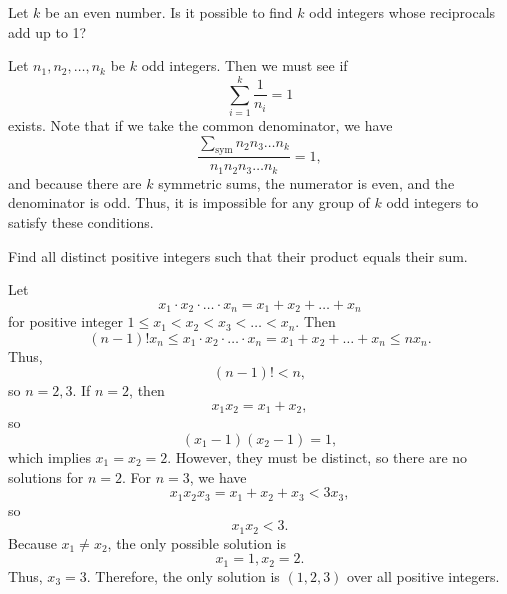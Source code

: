 \documentclass{article}
\begin{document}
\begin{exam}
Let $k$ be an even number. Is it possible to find $k$ odd integers whose reciprocals add up to 1?
\end{exam}
\begin{sol}
Let $n_1,n_2,\ldots,n_k$ be $k$ odd integers. Then we must see if
$$\sum_{i=1}^k \frac{1}{n_i} = 1$$
exists. Note that if we take the common denominator, we have
$$\frac{\sum_{\text{sym}} n_2n_3\ldots n_k}{n_1n_2n_3\ldots n_k} = 1,$$
and because there are $k$ symmetric sums, the numerator is even, and the denominator is odd. Thus, it is impossible for any group of $k$ odd integers to satisfy these conditions.
\end{sol}
\begin{exam}
Find all distinct positive integers such that their product equals their sum.
\end{exam}
\begin{sol}
Let
$$x_1 \cdot x_2 \cdot \ldots \cdot x_n = x_1 + x_2 + \ldots + x_n$$
for positive integer $1\le x_1 < x_2 < x_3 < \ldots < x_n$. Then
$$(n-1)! x_n \le x_1 \cdot x_2 \cdot \ldots \cdot x_n = x_1 + x_2 + \ldots + x_n \le nx_n.$$
Thus,
$$(n-1)! < n,$$
so $n=2,3$. If $n=2$, then
$$x_1x_2 = x_1 + x_2,$$
so
$$(x_1-1)(x_2-1) = 1,$$
which implies $x_1=x_2=2$. However, they must be distinct, so there are no solutions for $n=2$. For $n=3$, we have
$$x_1x_2x_3 = x_1+x_2+x_3<3x_3,$$
so
$$x_1x_2<3.$$
Because $x_1 \neq x_2$, the only possible solution is
$$x_1=1,x_2=2.$$
Thus, $x_3=3$. Therefore, the only solution is $(1,2,3)$ over all positive integers.
\end{sol}
\problems
{}





\end{document}
